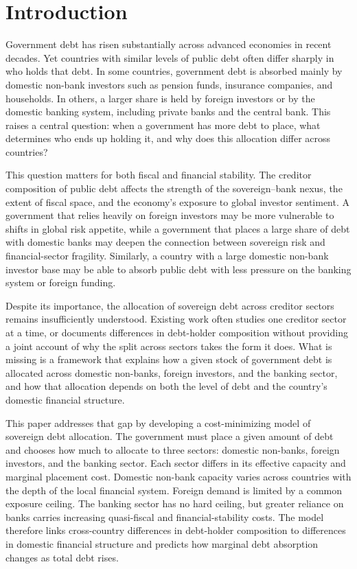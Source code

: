 \documentclass[\latexroot/\projectname]{subfiles}
\begin{document}
\section{Introduction}
\whenintegrated{\label{sec:intro}} %
\setcounter{page}{0}

Government debt has risen substantially across advanced economies in recent
decades. Yet countries with similar levels of public debt often differ sharply
in who holds that debt. In some countries, government debt is absorbed mainly
by domestic non-bank investors such as pension funds, insurance companies, and
households. In others, a larger share is held by foreign investors or by the
domestic banking system, including private banks and the central bank. This
raises a central question: when a government has more debt to place, what
determines who ends up holding it, and why does this allocation differ across
countries?

This question matters for both fiscal and financial stability. The creditor
composition of public debt affects the strength of the sovereign--bank nexus,
the extent of fiscal space, and the economy's exposure to global investor
sentiment. A government that relies heavily on foreign investors may be more
vulnerable to shifts in global risk appetite, while a government that places a
large share of debt with domestic banks may deepen the connection between
sovereign risk and financial-sector fragility. Similarly, a country with a
large domestic non-bank investor base may be able to absorb public debt with
less pressure on the banking system or foreign funding.

Despite its importance, the allocation of sovereign debt across creditor
sectors remains insufficiently understood. Existing work often studies one
creditor sector at a time, or documents differences in debt-holder composition
without providing a joint account of why the split across sectors takes the
form it does. What is missing is a framework that explains how a given stock of
government debt is allocated across domestic non-banks, foreign investors, and
the banking sector, and how that allocation depends on both the level of debt
and the country's domestic financial structure.

This paper addresses that gap by developing a cost-minimizing model of
sovereign debt allocation. The government must place a given amount of debt and
chooses how much to allocate to three sectors: domestic non-banks, foreign
investors, and the banking sector. Each sector differs in its effective
capacity and marginal placement cost. Domestic non-bank capacity varies across
countries with the depth of the local financial system. Foreign demand is
limited by a common exposure ceiling. The banking sector has no hard ceiling,
but greater reliance on banks carries increasing quasi-fiscal and
financial-stability costs. The model therefore links cross-country differences
in debt-holder composition to differences in domestic financial structure and
predicts how marginal debt absorption changes as total debt rises.
\end{document}
